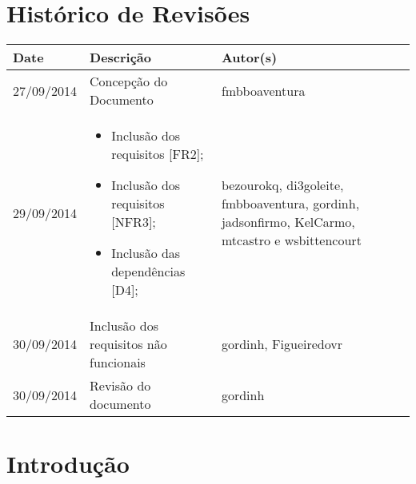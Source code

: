 \documentclass{article}
\begin{document}

\capa
\newpage

\section*{\center Histórico de Revisões}
  \vspace*{1cm}
  \begin{table}[ht]
    \centering
    \begin{tabular}[pos]{|m{2cm} | m{7.2cm} | m{3.8cm}|} 
      \hline
      \cellcolor[gray]{0.9}
      \textbf{Date} & \cellcolor[gray]{0.9}\textbf{Descrição} & \cellcolor[gray]{0.9}\textbf{Autor(s)}\\ \hline
      \hline
      \small 27/09/2014 & \small Concepção do Documento & \small fmbboaventura \\ \hline      
      \small 29/09/2014 &
      \begin{small}
        \begin{itemize}
          \item Inclusão dos requisitos [FR2];
          \item Inclusão dos requisitos [NFR3];
          \item Inclusão das dependências [D4];
        \end{itemize}
      \end{small} & \small bezourokq, di3goleite, fmbboaventura, gordinh, jadsonfirmo, KelCarmo, mtcastro e wsbittencourt \\ \hline 
      \small 30/09/2014 & \small Inclusão dos requisitos não funcionais & \small gordinh, Figueiredovr \\ \hline
      \small 30/09/2014 & \small Revisão do documento & \small gordinh \\ \hline
    \end{tabular}
  \end{table}

\newpage

\tableofcontents
\newpage

\section{Introdução}
\end{document}
